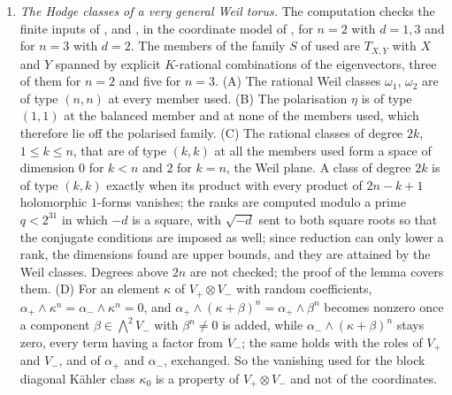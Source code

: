 \begin{enumerate}[label=\textup{(\Roman*)},leftmargin=*]
  $\bigwedge^{2n}P$ and $\bigwedge^{2n}Q$ contract $\omega$ to nonzero
  multiples of the generator of $H^{0,2n}$; contraction with $\omega$ is
  injective on $\bigwedge^{2n-2}P\oplus\bigwedge^{2n-2}Q$; and the pairing
  $\bigwedge^{2}P\times\bigwedge^{2n-2}P\to\bigwedge^{2n}P$ is perfect.
  (D) The alternating sum of the lower bounds $1,2\binom{2n}{1},\dots,1$ is
  $-2$ for every $n\le60$; at $n=2$ and $n=3$, exhaustive search over the
  admissible profiles shows $2e_{0}\ge\chi+4$, hence $e_{0}\ge3$, lists the
  smallest profiles, and gives $e_{1}\le e_{0}+9$ at $n=3$; at $n=4$ and
  $n=5$ a profile with $e_{0}=1$ satisfies the same constraints, so the bound
  on $\End$ is special to $n\le3$; and the same identity with $\chi=0$ on the
  Mumford square returns the $800$ odd self-extensions of item (XLV).
\item \emph{The Hodge classes of a very general Weil torus.} The
  computation checks the finite inputs of ,
   and , in the coordinate model of , for
  $n=2$ with $d=1,3$ and for $n=3$ with $d=2$. The members of the family $S$
  of  used are $T_{X,Y}$ with $X$ and $Y$ spanned by
  explicit $K$-rational combinations of the eigenvectors, three of them for
  $n=2$ and five for $n=3$. (A) The rational Weil classes $\omega_{1}$,
  $\omega_{2}$ are of type $(n,n)$ at every member used. (B) The
  polarisation $\eta$ is of type $(1,1)$ at the balanced member and at none of
  the members used, which therefore lie off the polarised family. (C) The
  rational classes of degree $2k$, $1\le k\le n$, that are of type $(k,k)$
  at all the members used form a space of dimension $0$ for $k<n$ and $2$ for
  $k=n$, the Weil plane. A class of degree $2k$ is of type $(k,k)$ exactly
  when its product with every product of $2n-k+1$ holomorphic $1$-forms
  vanishes; the ranks are computed modulo a prime $q<2^{31}$ in which $-d$ is
  a square, with $\sqrt{-d}$ sent to both square roots so that the conjugate
  conditions are imposed as well; since reduction can only lower a rank, the
  dimensions found are upper bounds, and they are attained by the Weil
  classes. Degrees above $2n$ are not checked; the proof of the lemma covers
  them. (D) For an element $\kappa$ of $V_{+}\otimes V_{-}$ with random
  coefficients, $\alpha_{+}\wedge\kappa^{n}=\alpha_{-}\wedge\kappa^{n}=0$,
  and $\alpha_{+}\wedge(\kappa+\beta)^{n}=\alpha_{+}\wedge\beta^{n}$ becomes
  nonzero once a component $\beta\in\bigwedge^{2}V_{-}$ with
  $\beta^{n}\ne0$ is added, while $\alpha_{-}\wedge(\kappa+\beta)^{n}$ stays
  zero, every term having a factor from $V_{-}$; the same holds with the
  roles of $V_{+}$ and $V_{-}$, and of $\alpha_{+}$ and $\alpha_{-}$,
  exchanged. So the vanishing used for the block diagonal K\"ahler class
  $\kappa_{0}$ is a property of $V_{+}\otimes V_{-}$ and not of the
  coordinates.


\end{enumerate}
